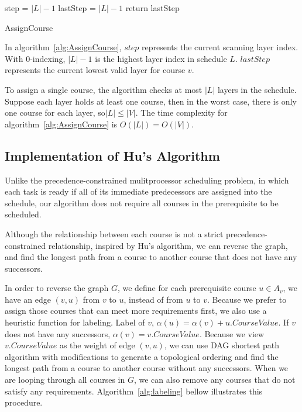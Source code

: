 \documentclass[letterpaper,12pt]{article}
\theoremstyle{definition}
\begin{document}
\begin{algorithm}[H]
\DontPrintSemicolon
{}

step = $|L|-1$\;
lastStep = $|L| -1$ \;
    return lastStep\;

\caption{AssignCourse}\label{alg:AssignCourse}
\end{algorithm}
\bigskip
In algorithm~\ref{alg:AssignCourse}, $step$ represents the current scanning layer index. With 0-indexing, $|L|-1$ is the highest layer index in schedule $L$. $lastStep$ represents the current lowest valid layer for course $v$. 

To assign a single course, the algorithm checks at most $|L|$ layers in the schedule. Suppose each layer holds at least one course, then in the worst case, there is only one course for each layer, so$|L|\leq |V|$. The time complexity for  algorithm~\ref{alg:AssignCourse} is $O(|L|)=O(|V|)$. 


\subsection{Implementation of Hu's Algorithm}\label{HuAlgorithm}

Unlike the precedence-constrained mulitprocessor scheduling problem, in which each task is ready if all of its immediate predecessors are assigned into the schedule, our algorithm does not require all courses in the prerequisite to be scheduled. 

Although the relationship between each course is not a strict precedence-constrained relationship, inspired by Hu's algorithm, we can reverse the graph, and find the longest path from a course to another course that does not have any successors. 

In order to reverse the graph $G$, we define for each prerequisite course $u \in A_v$, we have an edge $(v,u)$ from $v$ to $u$, instead of from $u$ to $v$.
Because we prefer to assign those courses that can meet more requirements first, we also use a heuristic function for labeling. Label of $v$, $\alpha(u) = \alpha(v)+u.CourseValue$. If $v$ does not have any successors, $\alpha(v)=v.CourseValue$. Because we view $v.CourseValue$ as the weight of edge $(v,u)$, we can use DAG shortest path algorithm with modifications to generate a topological ordering and find the longest path from a course to another course without any successors. When we are looping through all courses in $G$, we can also remove any courses that do not satisfy any requirements.
Algorithm~\ref{alg:labeling} bellow illustrates this procedure. 
\end{document}
